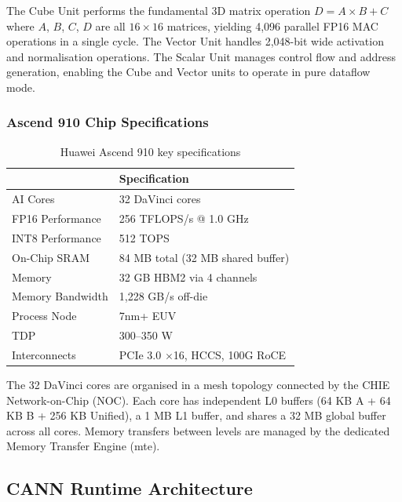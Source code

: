 The Cube Unit performs the fundamental 3D matrix operation
$D = A \times B + C$ where $A$, $B$, $C$, $D$ are all $16 \times 16$
matrices, yielding 4,096 parallel FP16 MAC operations in a single cycle.
The Vector Unit handles 2,048-bit wide activation and normalisation operations.
The Scalar Unit manages control flow and address generation, enabling the
Cube and Vector units to operate in pure dataflow mode.

\subsubsection{Ascend 910 Chip Specifications}

\begin{table}[htbp]
  \centering
  \caption{Huawei Ascend 910 key specifications}
  \label{tab:ascend-910-specs}
  \begin{tabularx}{0.9\textwidth}{lX}
    \toprule
    \tableheader{Parameter & Specification} \\
    \midrule
    AI Cores           & 32 DaVinci cores \\
    \rowcolor{TableRowOdd}
    FP16 Performance   & 256 TFLOPS/s @ 1.0 GHz \\
    INT8 Performance   & 512 TOPS \\
    \rowcolor{TableRowOdd}
    On-Chip SRAM       & 84 MB total (32 MB shared buffer) \\
    Memory             & 32 GB HBM2 via 4 channels \\
    \rowcolor{TableRowOdd}
    Memory Bandwidth   & 1,228 GB/s off-die \\
    Process Node       & 7nm+ EUV \\
    \rowcolor{TableRowOdd}
    TDP                & 300–350 W \\
    Interconnects      & PCIe 3.0 $\times$16, HCCS, 100G RoCE \\
    \bottomrule
  \end{tabularx}
\end{table}

The 32 DaVinci cores are organised in a mesh topology connected by the
CHIE Network-on-Chip (NOC). Each core has independent L0 buffers
(64 KB A + 64 KB B + 256 KB Unified), a 1 MB L1 buffer, and shares a
32 MB global buffer across all cores. Memory transfers between levels
are managed by the dedicated Memory Transfer Engine (\acrshort{mte}).


\subsection{CANN Runtime Architecture}
\label{subsec:cann}

